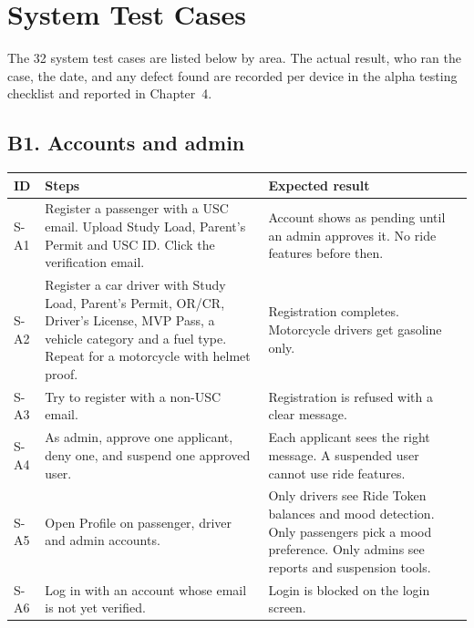 \chapter{System Test Cases}
\label{app:systemcases}
\clearpage

The 32 system test cases are listed below by area. The actual result, who ran the case, the date, and any defect found are recorded per device in the alpha testing checklist and reported in Chapter~4.

\section*{B1. Accounts and admin}
\small
\begin{longtable}{|p{1.1cm}|p{6.6cm}|p{6.3cm}|}
\hline
\textbf{ID} & \textbf{Steps} & \textbf{Expected result} \\
\hline
\endhead
S-A1 & Register a passenger with a USC email. Upload Study Load, Parent’s Permit and USC ID. Click the verification email. & Account shows as pending until an admin approves it. No ride features before then. \\
\hline
S-A2 & Register a car driver with Study Load, Parent’s Permit, OR/CR, Driver’s License, MVP Pass, a vehicle category and a fuel type. Repeat for a motorcycle with helmet proof. & Registration completes. Motorcycle drivers get gasoline only. \\
\hline
S-A3 & Try to register with a non-USC email. & Registration is refused with a clear message. \\
\hline
S-A4 & As admin, approve one applicant, deny one, and suspend one approved user. & Each applicant sees the right message. A suspended user cannot use ride features. \\
\hline
S-A5 & Open Profile on passenger, driver and admin accounts. & Only drivers see Ride Token balances and mood detection. Only passengers pick a mood preference. Only admins see reports and suspension tools. \\
\hline
S-A6 & Log in with an account whose email is not yet verified. & Login is blocked on the login screen. \\
\hline
\end{longtable}
\normalsize

